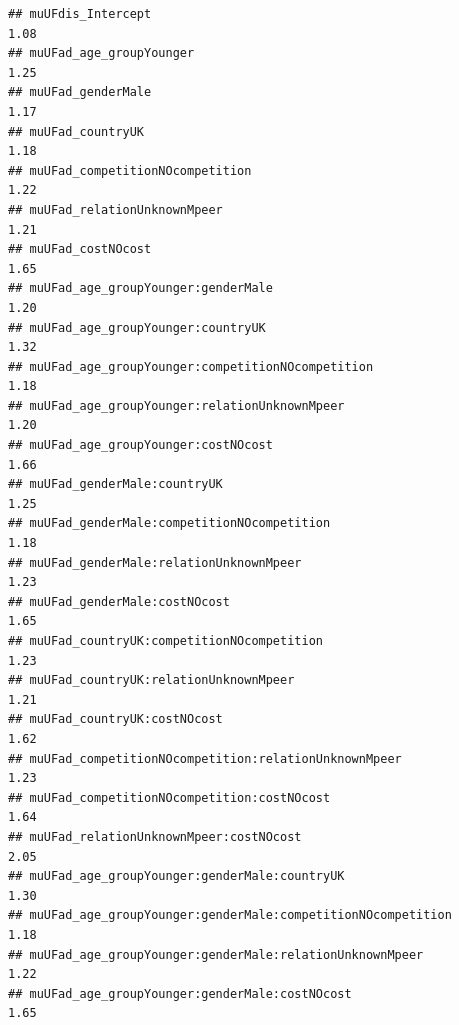 \documentclass[
]{article}
\begin{document}
\begin{verbatim}
## muUFdis_Intercept                                                                            1.08
## muUFad_age_groupYounger                                                                      1.25
## muUFad_genderMale                                                                            1.17
## muUFad_countryUK                                                                             1.18
## muUFad_competitionNOcompetition                                                              1.22
## muUFad_relationUnknownMpeer                                                                  1.21
## muUFad_costNOcost                                                                            1.65
## muUFad_age_groupYounger:genderMale                                                           1.20
## muUFad_age_groupYounger:countryUK                                                            1.32
## muUFad_age_groupYounger:competitionNOcompetition                                             1.18
## muUFad_age_groupYounger:relationUnknownMpeer                                                 1.20
## muUFad_age_groupYounger:costNOcost                                                           1.66
## muUFad_genderMale:countryUK                                                                  1.25
## muUFad_genderMale:competitionNOcompetition                                                   1.18
## muUFad_genderMale:relationUnknownMpeer                                                       1.23
## muUFad_genderMale:costNOcost                                                                 1.65
## muUFad_countryUK:competitionNOcompetition                                                    1.23
## muUFad_countryUK:relationUnknownMpeer                                                        1.21
## muUFad_countryUK:costNOcost                                                                  1.62
## muUFad_competitionNOcompetition:relationUnknownMpeer                                         1.23
## muUFad_competitionNOcompetition:costNOcost                                                   1.64
## muUFad_relationUnknownMpeer:costNOcost                                                       2.05
## muUFad_age_groupYounger:genderMale:countryUK                                                 1.30
## muUFad_age_groupYounger:genderMale:competitionNOcompetition                                  1.18
## muUFad_age_groupYounger:genderMale:relationUnknownMpeer                                      1.22
## muUFad_age_groupYounger:genderMale:costNOcost                                                1.65

\end{verbatim}
\end{document}
